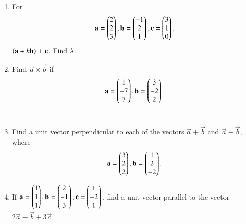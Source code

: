 \begin{enumerate}[label=\arabic*.,ref=\thesubsection.\theenumi]
\item For 
\begin{align}
\mathbf{a} = \begin{pmatrix}2\\2\\3\end{pmatrix}, \mathbf{b} = \begin{pmatrix}-1\\2\\1\end{pmatrix}, \mathbf{c} = \begin{pmatrix}3\\1\\0\end{pmatrix},
\end{align}
$\left(\mathbf{a}+k\mathbf{b}\right)\perp\mathbf{c}$.  Find $\lambda$.
\solution


\item Find ${\vec{a} \times \vec{b}}$ if 
\begin{align}
\mathbf{a}=\begin{pmatrix}1\\-7\\7\end{pmatrix},
\mathbf{b}=\begin{pmatrix}3\\-2\\2\end{pmatrix}.
\end{align}
\\
\solution 

\item Find a unit vector perpendicular to each of the vectors 
$\vec{a}+\vec{b}$ and $\vec{a}-\vec{b}$, where 
\begin{align}
\mathbf{a}=\begin{pmatrix}3\\2\\2\end{pmatrix},
\mathbf{b}=\begin{pmatrix}1\\2\\-2\end{pmatrix}.
\end{align}
\item  If 
$
\mathbf{a}=\begin{pmatrix}1\\1\\1\end{pmatrix},
\mathbf{b}=\begin{pmatrix}2\\-1\\3\end{pmatrix},
\mathbf{c}=\begin{pmatrix}1\\-2\\1\end{pmatrix},
$
find a unit vector parallel to the vector $2\vec{a}-\vec{b}+3\vec{c}$.
\\
\solution 



\end{enumerate}
